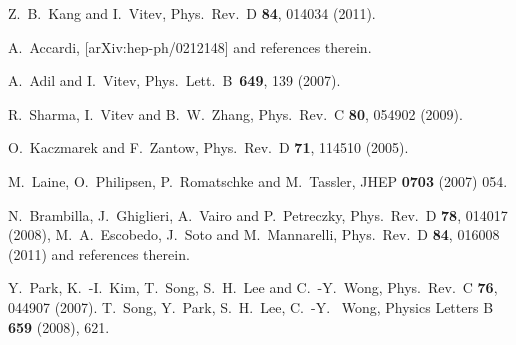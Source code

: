 \documentclass[article,showpacs,preprintnumbers,amsmath,amssymb]{revtex4}
\begin{document}
\begin{thebibliography}{80}
  Z.~B.~Kang and I.~Vitev,
  Phys.\ Rev.\  D {\bf 84}, 014034 (2011).

 A.~Accardi,
 [arXiv:hep-ph/0212148] and references therein.

  A.~Adil and I.~Vitev,
  Phys.\ Lett.\ B\ {\bf 649}, 139  (2007).

  R.~Sharma, I.~Vitev and B.~W.~Zhang,
  Phys.\ Rev.\  C {\bf 80}, 054902 (2009).

  O.~Kaczmarek and F.~Zantow,
  Phys.\ Rev.\  D {\bf 71}, 114510 (2005).

  M.~Laine, O.~Philipsen, P.~Romatschke and M.~Tassler,
  JHEP {\bf 0703} (2007) 054.

  N.~Brambilla, J.~Ghiglieri, A.~Vairo and P.~Petreczky,
  Phys.\ Rev.\ D {\bf 78}, 014017 (2008),
  M.~A.~Escobedo, J.~Soto and M.~Mannarelli,
  Phys.\ Rev.\  D {\bf 84}, 016008 (2011) and references therein.

  Y.~Park, K.~-I.~Kim, T.~Song, S.~H.~Lee and C.~-Y.~Wong,
  Phys.\ Rev.\ C {\bf 76}, 044907 (2007).
  T.~Song, Y.~Park, S.~H.~Lee, C.~-Y.~ Wong,
  Physics Letters B {\bf{659}} (2008), 621.


\end{thebibliography}
\end{document}
